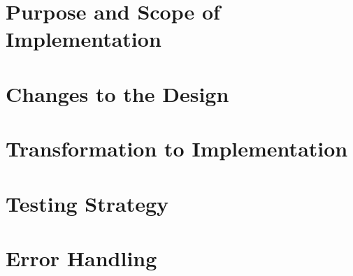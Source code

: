 \documentclass{article}
\begin{document}

\tableofcontents
\listoffigures

\section{Purpose and Scope of Implementation} %


\section{Changes to the Design} %

\section{Transformation to Implementation} %

\section{Testing Strategy} %

\section{Error Handling} 
\end{document}

